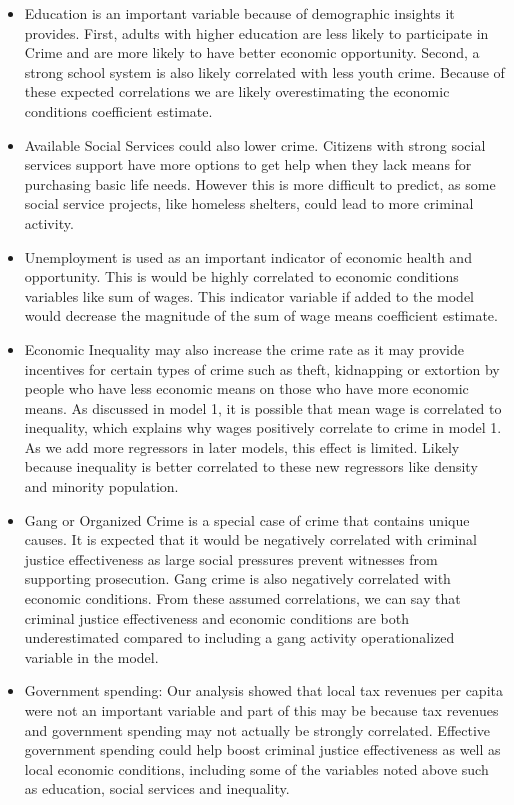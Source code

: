\documentclass[]{article}
\providecommand{\tightlist}{%
  \setlength{\itemsep}{0pt}\setlength{\parskip}{0pt}}
\begin{document}
\begin{itemize}
\tightlist
\item
  Education is an important variable because of demographic insights it
  provides. First, adults with higher education are less likely to
  participate in Crime and are more likely to have better economic
  opportunity. Second, a strong school system is also likely correlated
  with less youth crime. Because of these expected correlations we are
  likely overestimating the economic conditions coefficient estimate.
\item
  Available Social Services could also lower crime. Citizens with strong
  social services support have more options to get help when they lack
  means for purchasing basic life needs. However this is more difficult
  to predict, as some social service projects, like homeless shelters,
  could lead to more criminal activity.
\item
  Unemployment is used as an important indicator of economic health and
  opportunity. This is would be highly correlated to economic conditions
  variables like sum of wages. This indicator variable if added to the
  model would decrease the magnitude of the sum of wage means
  coefficient estimate.
\item
  Economic Inequality may also increase the crime rate as it may provide
  incentives for certain types of crime such as theft, kidnapping or
  extortion by people who have less economic means on those who have
  more economic means. As discussed in model 1, it is possible that mean
  wage is correlated to inequality, which explains why wages positively
  correlate to crime in model 1. As we add more regressors in later
  models, this effect is limited. Likely because inequality is better
  correlated to these new regressors like density and minority
  population.\\
\item
  Gang or Organized Crime is a special case of crime that contains
  unique causes. It is expected that it would be negatively correlated
  with criminal justice effectiveness as large social pressures prevent
  witnesses from supporting prosecution. Gang crime is also negatively
  correlated with economic conditions. From these assumed correlations,
  we can say that criminal justice effectiveness and economic conditions
  are both underestimated compared to including a gang activity
  operationalized variable in the model.\\
\item
  Government spending: Our analysis showed that local tax revenues per
  capita were not an important variable and part of this may be because
  tax revenues and government spending may not actually be strongly
  correlated. Effective government spending could help boost criminal
  justice effectiveness as well as local economic conditions, including
  some of the variables noted above such as education, social services
  and inequality.
\end{itemize}
\end{document}
